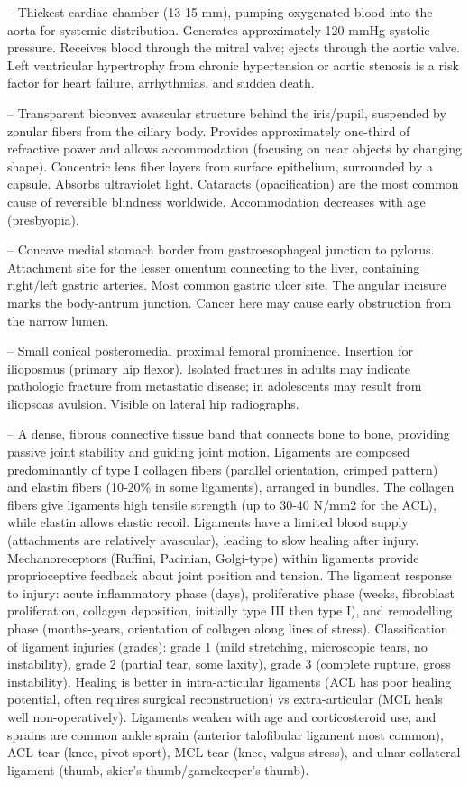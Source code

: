 -- Thickest cardiac chamber (13-15 mm), pumping oxygenated blood into the aorta for systemic distribution. Generates approximately 120 mmHg systolic pressure. Receives blood through the mitral valve; ejects through the aortic valve. Left ventricular hypertrophy from chronic hypertension or aortic stenosis is a risk factor for heart failure, arrhythmias, and sudden death.

-- Transparent biconvex avascular structure behind the iris/pupil, suspended by zonular fibers from the ciliary body. Provides approximately one-third of refractive power and allows accommodation (focusing on near objects by changing shape). Concentric lens fiber layers from surface epithelium, surrounded by a capsule. Absorbs ultraviolet light. Cataracts (opacification) are the most common cause of reversible blindness worldwide. Accommodation decreases with age (presbyopia).

-- Concave medial stomach border from gastroesophageal junction to pylorus. Attachment site for the lesser omentum connecting to the liver, containing right/left gastric arteries. Most common gastric ulcer site. The angular incisure marks the body-antrum junction. Cancer here may cause early obstruction from the narrow lumen.

-- Small conical posteromedial proximal femoral prominence. Insertion for ilioposmus (primary hip flexor). Isolated fractures in adults may indicate pathologic fracture from metastatic disease; in adolescents may result from iliopsoas avulsion. Visible on lateral hip radiographs.

-- A dense, fibrous connective tissue band that connects bone to bone, providing passive joint stability and guiding joint motion. Ligaments are composed predominantly of type I collagen fibers (parallel orientation, crimped pattern) and elastin fibers (10-20\% in some ligaments), arranged in bundles. The collagen fibers give ligaments high tensile strength (up to 30-40 N/mm2 for the ACL), while elastin allows elastic recoil. Ligaments have a limited blood supply (attachments are relatively avascular), leading to slow healing after injury. Mechanoreceptors (Ruffini, Pacinian, Golgi-type) within ligaments provide proprioceptive feedback about joint position and tension. The ligament response to injury: acute inflammatory phase (days), proliferative phase (weeks, fibroblast proliferation, collagen deposition, initially type III then type I), and remodelling phase (months-years, orientation of collagen along lines of stress). Classification of ligament injuries (grades): grade 1 (mild stretching, microscopic tears, no instability), grade 2 (partial tear, some laxity), grade 3 (complete rupture, gross instability). Healing is better in intra-articular ligaments (ACL has poor healing potential, often requires surgical reconstruction) vs extra-articular (MCL heals well non-operatively). Ligaments weaken with age and corticosteroid use, and sprains are common ankle sprain (anterior talofibular ligament most common), ACL tear (knee, pivot sport), MCL tear (knee, valgus stress), and ulnar collateral ligament (thumb, skier's thumb/gamekeeper's thumb).

